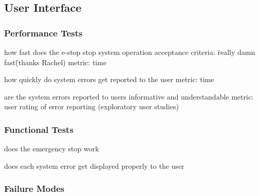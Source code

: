 
\subsection{User Interface}
\label{sec:verification_ui}


\subsubsection{Performance Tests}
\label{sec:ui_pt}

how fast does the e-stop stop system operation
acceptance criteria: \"really damn fast\" (thanks Rachel)
metric: time

how quickly do system errors get reported to the user
metric: time

are the system errors reported to users informative and understandable
metric: user rating of error reporting (exploratory user studies)

\subsubsection{Functional Tests}
\label{sec:ui_ft}

does the emergency stop work

does each system error get displayed properly to the user

\subsubsection{Failure Modes}
\label{sec:ui_fm}
